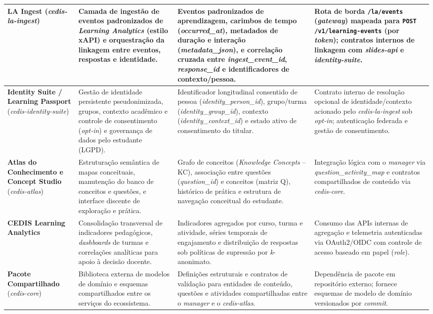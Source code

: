 {\begin{longtable}{>{\raggedright\arraybackslash}p{2.6cm}>{\raggedright\arraybackslash}p{3.4cm}>{\raggedright\arraybackslash}p{4.3cm}>{\raggedright\arraybackslash}p{3.5cm}}
\hline
\textbf{LA Ingest} (\textit{cedis-la-ingest}) & Camada de ingestão de eventos padronizados de \textit{Learning Analytics} (estilo xAPI) e orquestração da linkagem entre eventos, respostas e identidade. & Eventos padronizados de aprendizagem, carimbos de tempo (\textit{occurred\_at}), metadados de duração e interação (\textit{metadata\_json}), e correlação cruzada entre \textit{ingest\_event\_id}, \textit{response\_id} e identificadores de contexto/pessoa. & Rota de borda \texttt{/la/events} (\textit{gateway}) mapeada para \texttt{POST} \texttt{/v1/learning-\allowbreak events} (por \textit{token}); contratos internos de linkagem com \textit{slides-api} e \textit{identity-suite}. \\
\hline
\textbf{Identity Suite / Learning Passport} (\textit{cedis-identity-\allowbreak suite}) & Gestão de identidade persistente pseudonimizada, grupos, contexto acadêmico e controle de consentimento (\textit{opt-in}) e governança de dados pelo estudante (LGPD). & Identificador longitudinal consentido de pessoa (\textit{identity\_person\_id}), grupo/turma (\textit{identity\_group\_id}), contexto (\textit{identity\_context\_id}) e estado ativo de consentimento do titular. & Contrato interno de resolução opcional de identidade/contexto acionado pelo \textit{cedis-la-ingest} sob \textit{opt-in}; autenticação federada e gestão de consentimento. \\
\hline
\textbf{Atlas do Conhecimento e Concept Studio} (\textit{cedis-atlas}) & Estruturação semântica de mapas conceituais, manutenção do banco de conceitos e questões, e interface discente de exploração e prática. & Grafo de conceitos (\textit{Knowledge Concepts} -- KC), associação entre questões (\textit{question\_id}) e conceitos (matriz Q), histórico de prática e estrutura de navegação conceitual do estudante. & Integração lógica com o \textit{manager} via \textit{question\_\allowbreak activity\_map} e contratos compartilhados de conteúdo via \textit{cedis-core}. \\
\hline
\textbf{CEDIS Learning Analytics} & Consolidação transversal de indicadores pedagógicos, \textit{dashboards} de turmas e correlações analíticas para apoio à decisão docente. & Indicadores agregados por curso, turma e atividade, séries temporais de engajamento e distribuição de respostas sob políticas de supressão por \textit{k}-anonimato. & Consumo das APIs internas de agregação e telemetria autenticadas via OAuth2/OIDC com controle de acesso baseado em papel (\textit{role}). \\
\hline
\textbf{Pacote Compartilhado} (\textit{cedis-core}) & Biblioteca externa de modelos de domínio e esquemas compartilhados entre os serviços do ecossistema. & Definições estruturais e contratos de validação para entidades de conteúdo, questões e atividades compartilhadas entre o \textit{manager} e o \textit{cedis-atlas}. & Dependência de pacote em repositório externo; fornece esquemas de modelo de domínio versionados por \textit{commit}. \\
\hline
\end{longtable}
}

